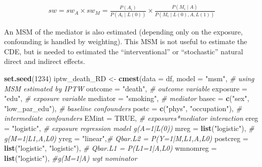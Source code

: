 \documentclass[
]{book}
\newenvironment{Shaded}{\begin{snugshade}}{\end{snugshade}}
\newcommand{\AttributeTok}[1]{\textcolor[rgb]{0.13,0.29,0.53}{#1}}
\newcommand{\CommentTok}[1]{\textcolor[rgb]{0.56,0.35,0.01}{\textit{#1}}}
\newcommand{\ConstantTok}[1]{\textcolor[rgb]{0.56,0.35,0.01}{#1}}
\newcommand{\DecValTok}[1]{\textcolor[rgb]{0.00,0.00,0.81}{#1}}
\newcommand{\FunctionTok}[1]{\textcolor[rgb]{0.13,0.29,0.53}{\textbf{#1}}}
\newcommand{\NormalTok}[1]{#1}
\newcommand{\OtherTok}[1]{\textcolor[rgb]{0.56,0.35,0.01}{#1}}
\newcommand{\StringTok}[1]{\textcolor[rgb]{0.31,0.60,0.02}{#1}}
\begin{document}
\begin{align*}
    sw = sw_A \times sw_M = \frac{P(A_i)}{P(A_i \mid L(0))} \times \frac{P(M_i \mid A)}{P(M_i \mid L(0),A,L(1))}
  \end{align*}

An MSM of the mediator is also estimated (depending only on the exposure, confounding is handled by weighting). This MSM is not useful to estimate the CDE, but is needed to estimated the ``interventional'' or ``stochastic'' natural direct and indirect effects.

\begin{Shaded}
\begin{Highlighting}[]
\FunctionTok{set.seed}\NormalTok{(}\DecValTok{1234}\NormalTok{)}
\NormalTok{iptw\_death\_RD }\OtherTok{\textless{}{-}} \FunctionTok{cmest}\NormalTok{(}\AttributeTok{data =}\NormalTok{ df, }
                       \AttributeTok{model =} \StringTok{"msm"}\NormalTok{, }\CommentTok{\# using MSM estimated by IPTW}
                       \AttributeTok{outcome =} \StringTok{"death"}\NormalTok{, }\CommentTok{\# outcome variable}
                       \AttributeTok{exposure =} \StringTok{"edu"}\NormalTok{, }\CommentTok{\# exposure variable}
                       \AttributeTok{mediator =} \StringTok{"smoking"}\NormalTok{, }\CommentTok{\# mediator}
                       \AttributeTok{basec =} \FunctionTok{c}\NormalTok{(}\StringTok{"sex"}\NormalTok{,     }
                                 \StringTok{"low\_par\_edu"}\NormalTok{), }\CommentTok{\# baseline confounders}
                       \AttributeTok{postc =} \FunctionTok{c}\NormalTok{(}\StringTok{"phys"}\NormalTok{, }
                                 \StringTok{"occupation"}\NormalTok{), }\CommentTok{\# intermediate confounders }
                       \AttributeTok{EMint =} \ConstantTok{TRUE}\NormalTok{, }\CommentTok{\# exposures*mediator interaction}
                       \AttributeTok{ereg =} \StringTok{"logistic"}\NormalTok{, }\CommentTok{\# exposure regression model g(A=1|L(0))}
                       \AttributeTok{mreg =} \FunctionTok{list}\NormalTok{(}\StringTok{"logistic"}\NormalTok{), }\CommentTok{\# g(M=1|L1,A,L0)}
                       \AttributeTok{yreg =} \StringTok{"linear"}\NormalTok{,}\CommentTok{\# Qbar.L2 = P(Y=1|M,L1,A,L0) }
                       \AttributeTok{postcreg =} \FunctionTok{list}\NormalTok{(}\StringTok{"logistic"}\NormalTok{, }\StringTok{"logistic"}\NormalTok{), }\CommentTok{\# Qbar.L1 = P(L1=1|A,L0)}
                       \AttributeTok{wmnomreg =} \FunctionTok{list}\NormalTok{(}\StringTok{"logistic"}\NormalTok{), }\CommentTok{\#g(M=1|A) wgt nominator}

\end{Highlighting}
\end{Shaded}
\end{document}
